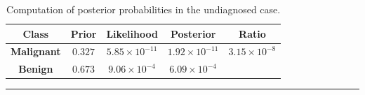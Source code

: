 \begin{enumerate}[noitemsep]
    \begin{table}[!t]
        \centering
        \begin{tabular}{c c c c c}
        \hline
        \textbf{Class} & \textbf{Prior} & \textbf{Likelihood} & \textbf{Posterior} & \textbf{Ratio}\\
        \hline
            \textbf{Malignant} & $0.327$ & $5.85\times 10^{-11}$ & $1.92\times 10^{-11}$ & $3.15 \times 10^{-8}$\\
        \textbf{Benign} & $0.673$ & $9.06\times 10^{-4}$ & $6.09\times 10^{-4}$ \\

        \hline
        \end{tabular}
        \caption[\small Computation of posterior probabilities in the undiagnosed case]{Computation of posterior probabilities in the undiagnosed case.}
        \label{tab:SA9}\hrule
     \end{table}    
        
\end{enumerate}

